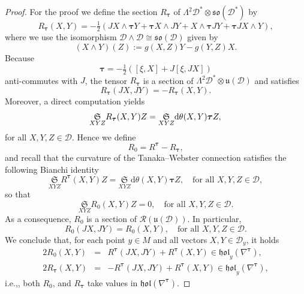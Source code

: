\documentclass{amsart}
\theoremstyle{plain}
\newtheorem{lem}[theorem]{Lemma}
\theoremstyle{definition}
\def\R{\mathcal{R}}
\def\so{\mathfrak{so}}
\def\u{\mathfrak{u}}
\newcommand{\h}{\mathfrak{h}}
\newcommand{\hol}{\mathfrak{hol}}
\newcommand{\bt}{{\boldsymbol{\tau}}}
\newcommand{\Real}{\mathbb{R}}
\newcommand{\Su}{\mathfrak{S}}
\newcommand{\1}{\mathbf{1}}
\newcommand{\D}{{\mathcal D}}
\renewcommand{\d}{\mathrm{d}}
\newcommand{\+}{\oplus}
\begin{document}
\begin{proof}
For the proof we 
define the section $R_\bt$ of $\Lambda^2\D^*\otimes \so(\D^*)$ by
	$$R_\bt(X,Y)=-\tfrac12\left(JX \wedge \bt Y + \bt X \wedge JY+ X \wedge\bt J Y+ \bt J X \wedge Y\right),$$ 
	where we use the isomorphism $\D\wedge \D\cong \so(\D)$ given by
	\[(X\wedge Y) (Z):= g(X,Z)Y-g(Y,Z)X.\]
Because
\[\bt=-\tfrac{1}{2}\left([\xi,X]+J[\xi,JX]\right)\]
anti-commutes with $J$, the tensor $R_\bt$ is a section of $\Lambda^2\D^*\otimes \u(\D)$ and satisfies 
 \[R_\bt(JX,JY)=-R_{\bt}(X,Y).\]
%
%
%
Moreover, a direct computation yields
\[
\underset{X Y Z}{\Su} R_\bt(X,Y)Z=\underset{X Y Z}{\Su} \d\theta(X,Y)\bt Z, \\
\]
for all $X,Y,Z\in\D$.
Hence we define $$R_0=R^\bt-R_\bt,$$ and  recall that the curvature of the Tanaka--Webster connection satisfies the following Bianchi identity
\begin{equation}\label{BianchiTWnew1}
\underset{X Y Z}{\Su} R^\bt(X,Y)Z=\underset{X Y Z}{\Su} \d\theta(X,Y)\bt Z,  \quad\text{for all } X,Y,Z\in\D,
\end{equation}
so that
 \begin{equation}\label{R0Bianchi}
\underset{X Y Z}{\Su} R_0(X,Y)Z=0,  \quad\text{for all } X,Y,Z\in\D.\end{equation}
As a consequence, 
$R_0$ is a section of  $\R(\u (\D))$.
 In particular, 
\begin{equation}
\label{R0J}
R_0(JX,JY)=R_0(X,Y),\quad \text{for all } X,Y,Z\in\D.\end{equation}
We conclude that, for each point $y\in M$ and all vectors $X,Y\in \D_y$, it holds
\begin{eqnarray}
\label{R0hol}
2R_0(X,Y)&=&R^\bt(JX,JY)+R^\bt(X,Y)\in\hol_y(\nabla^\bt),\\
\label{Rthol}
2R_\bt(X,Y)&=&-R^\bt(JX,JY)+R^\bt(X,Y)\in\hol_y(\nabla^\bt),
\end{eqnarray}
i.e.,, both  $R_0$, and $R_\bt$ take values in $\hol(\nabla^\bt)$.


\end{proof}
\end{document}
